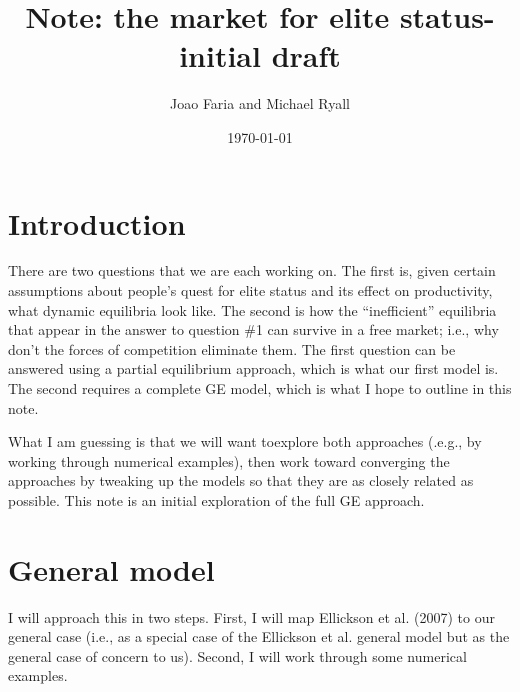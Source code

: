 \documentclass[12pt,letterpaper]{article}
\title{Note: the market for elite status-initial draft}
\author{Joao Faria and Michael Ryall}
\date{\today}
\begin{document}
	
	\maketitle
	
	
	\onehalfspacing
	
	\section{Introduction}
	There are two questions that we are each working on. 
	The first is, given certain assumptions about people's quest for elite status and its effect on productivity, what dynamic equilibria look like.
	The second is how the ``inefficient'' equilibria that appear in the answer to question \#1 can survive in a free market; i.e., why don't the forces of competition eliminate them.
	The first question can be answered using a partial equilibrium approach, which is what our first model is.
	The second requires a complete GE model, which is what I hope to outline in this note.
	
	What I am guessing is that we will want toexplore both approaches (.e.g., by working through numerical examples), then work toward converging the approaches by tweaking up the models so that they are as closely related as possible. 
	This note is an initial exploration of the full GE approach.
%	


	
	\section{General model}
	I will approach this in two steps. 
	First, I will map Ellickson et al. (2007) to our  general case (i.e., as a special case of the Ellickson et al. general model but as the general case of concern to us).
	Second, I will work through some numerical examples.
	
\end{document}
